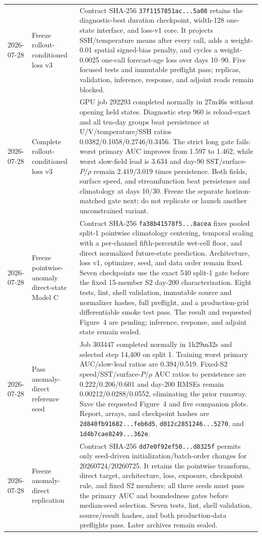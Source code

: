 \documentclass[11pt]{article}
\begin{document}
\begin{longtable}{@{}p{}p{}p{}@{}}
2026-07-28 & Freeze rollout-conditioned loss v3 & Contract SHA-256 \texttt{37f1157851ac...5a08} retains the diagnostic-best duration checkpoint, width-128 one-state interface, and loss-v1 core.  It projects SSH/temperature means after every call, adds a weight-0.01 spatial signed-bias penalty, and cycles a weight-0.0025 one-call forecast-age loss over days 10--90.  Five focused tests and immutable preflight pass; replicas, validation, inference, response, and adjoint reads remain blocked. \\
2026-07-28 & Complete rollout-conditioned loss v3 & GPU job 292293 completed normally in 27m46s without opening held states.  Diagnostic step 960 is reload-exact and all ten-day groups beat persistence at U/V/temperature/SSH ratios 0.0382/0.1058/0.2746/0.3456.  The strict long gate fails: worst primary AUC improves from 1.597 to 1.462, while worst slow-field lead is 3.634 and day-90 SST/surface-\(P/\rho\) remain 2.419/3.019 times persistence.  Both fields, surface speed, and streamfunction beat persistence and climatology at days 10/30.  Freeze the separate horizon-matched gate next; do not replicate or launch another unconstrained variant. \\
2026-07-28 & Freeze pointwise-anomaly direct-state Model C & Contract SHA-256 \texttt{fa38b41578f5...8acea} fixes pooled split-1 pointwise climatology centering, temporal scaling with a per-channel fifth-percentile wet-cell floor, and direct normalized future-state prediction.  Architecture, loss v1, optimizer, seed, and data order remain fixed.  Seven checkpoints use the exact 540 split-1 gate before the fixed 15-member S2 day-200 characterization.  Eight tests, lint, shell validation, immutable source and normalizer hashes, full preflight, and a production-grid differentiable smoke test pass.  The result and requested Figure~4 are pending; inference, response, and adjoint state remain sealed. \\
2026-07-28 & Pass anomaly-direct reference seed & Job 303447 completed normally in 1h29m32s and selected step 14,400 on split 1.  Training worst primary AUC/slow-lead ratios are 0.394/0.519.  Fixed-S2 speed/SST/surface-\(P/\rho\) AUC ratios to persistence are 0.222/0.206/0.601 and day-200 RMSEs remain 0.00212/0.0288/0.0552, eliminating the prior runaway.  Save the requested Figure~4 and five companion plots.  Report, arrays, and checkpoint hashes are \texttt{2d840fb91682...feb6d5}, \texttt{d012c2851246...5270}, and \texttt{1d4b7cae8249...362e}. \\
2026-07-28 & Freeze anomaly-direct replication & Contract SHA-256 \texttt{dd7e0f92ef50...d8325f} permits only seed-driven initialization/batch-order changes for 20260724/20260725.  It retains the pointwise transform, direct target, architecture, loss, exposure, checkpoint rule, and fixed S2 members; all three seeds must pass the primary AUC and boundedness gates before median-seed selection.  Seven tests, lint, shell validation, source/result hashes, and both production-data preflights pass.  Later archives remain sealed. \\

\end{longtable}
\end{document}
